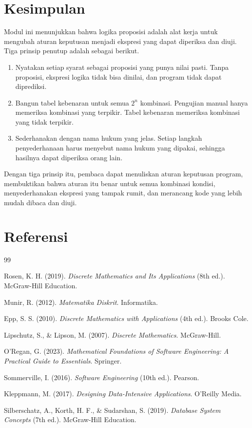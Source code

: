 \documentclass[11pt,a4paper]{article}
\begin{document}
\section{Kesimpulan}

Modul ini menunjukkan bahwa logika proposisi adalah alat kerja untuk mengubah aturan keputusan menjadi ekspresi yang dapat diperiksa dan diuji. Tiga prinsip penutup adalah sebagai berikut.

\begin{enumerate}
	\item Nyatakan setiap syarat sebagai proposisi yang punya nilai pasti. Tanpa proposisi, ekspresi logika tidak bisa dinilai, dan program tidak dapat diprediksi.
	\item Bangun tabel kebenaran untuk semua $2^n$ kombinasi. Pengujian manual hanya memeriksa kombinasi yang terpikir. Tabel kebenaran memeriksa kombinasi yang tidak terpikir.
	\item Sederhanakan dengan nama hukum yang jelas. Setiap langkah penyederhanaan harus menyebut nama hukum yang dipakai, sehingga hasilnya dapat diperiksa orang lain.
\end{enumerate}

Dengan tiga prinsip itu, pembaca dapat menuliskan aturan keputusan program, membuktikan bahwa aturan itu benar untuk semua kombinasi kondisi, menyederhanakan ekspresi yang tampak rumit, dan merancang kode yang lebih mudah dibaca dan diuji.

\newpage
\section*{Referensi}

\begin{thebibliography}{99}

	Rosen, K. H. (2019).
	\textit{Discrete Mathematics and Its Applications} (8th ed.).
	McGraw-Hill Education.

	Munir, R. (2012).
	\textit{Matematika Diskrit}.
	Informatika.

	Epp, S. S. (2010).
	\textit{Discrete Mathematics with Applications} (4th ed.).
	Brooks Cole.

	Lipschutz, S., \& Lipson, M. (2007).
	\textit{Discrete Mathematics}.
	McGraw-Hill.

	O'Regan, G. (2023).
	\textit{Mathematical Foundations of Software Engineering: A Practical Guide to Essentials}.
	Springer.

	Sommerville, I. (2016).
	\textit{Software Engineering} (10th ed.).
	Pearson.

	Kleppmann, M. (2017).
	\textit{Designing Data-Intensive Applications}.
	O'Reilly Media.

	Silberschatz, A., Korth, H. F., \& Sudarshan, S. (2019).
	\textit{Database System Concepts} (7th ed.).
	McGraw-Hill Education.

\end{thebibliography}
\end{document}
